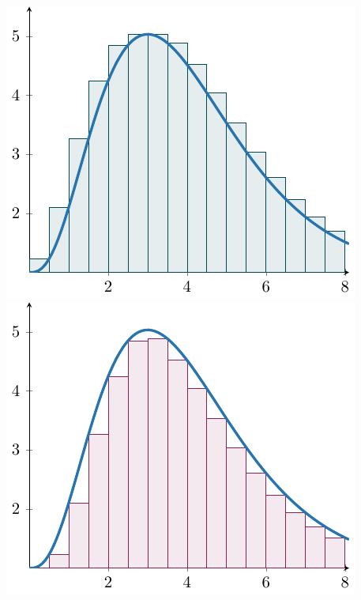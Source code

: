     \begin{center}
        \includegraphics{chapters/4-IntegrationRn/figures/figures-upperdarboux.pdf}
        \includegraphics{chapters/4-IntegrationRn/figures/figures-lowerdarboux.pdf}
    \end{center}

